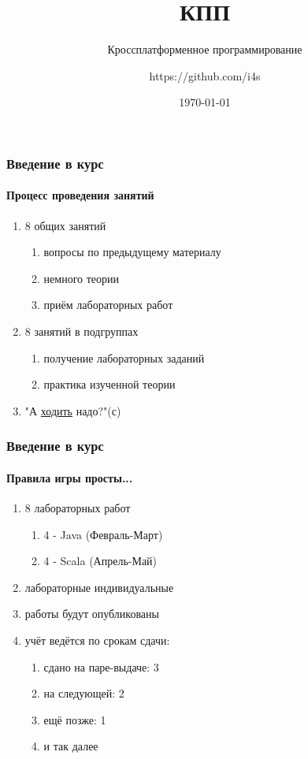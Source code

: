 \documentclass[10pt,pdf,hyperref={unicode}]{beamer}
\title{КПП}
\subtitle{Кроссплатформенное программирование}
\author{\tiny https://github.com/i4s}
\date{\tiny \today}
\begin{document}
\begin{frame}
\titlepage
\end{frame} 

\begin{frame}
\frametitle{Введение в курс} 
\framesubtitle{Процесс проведения занятий}
\begin{enumerate}
  \item 8 общих занятий
  \begin{enumerate}
    \item вопросы по предыдущему материалу
    \item немного теории
    \item приём лабораторных работ
  \end{enumerate}
  \item 8 занятий в подгруппах
  \begin{enumerate}
    \item получение лабораторных заданий
    \item практика изученной теории
  \end{enumerate}
  \item "А \underline{ходить} надо?"(с)
\end{enumerate}
\end{frame}

\begin{frame}
\frametitle{Введение в курс} 
\framesubtitle{Правила игры просты...}
\begin{enumerate}
  \item 8 лабораторных работ
  \begin{enumerate}
    \item 4 - Java (Февраль-Март)
    \item 4 - Scala (Апрель-Май)
  \end{enumerate}
  \item лабораторные индивидуальные
  \item работы будут опубликованы
  \item учёт ведётся по срокам сдачи:
  \begin{enumerate}
    \item сдано на паре-выдаче: 3
    \item на следующей: 2
    \item ещё позже: 1
    \item и так далее
  \end{enumerate}
\end{enumerate}
\end{frame}
\end{document}

